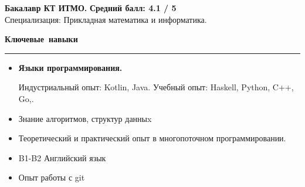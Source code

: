 \documentclass[12pt, a4paper]{report}
\begin{document}
    \textbf{Бакалавр КТ ИТМО.}
    \hfill
    \textbf{ Средний балл: 4.1 / 5} \\
    Специализация: Прикладная математика и информатика.\\


    \par\hbox{\large\textbf{Ключевые навыки}}\kern5pt\hrule\kern5pt

    \begin{itemize}

        \item \textbf{Языки программирования.}

        Индустриальный опыт: Kotlin, Java. Учебный опыт: Haskell, Python, C++, Go,.

        \item Знание алгоритмов, структур данныx
        \item Теоретический и практический опыт в многопоточном программировании.
        \item B1-B2 Английский язык
        \item Опыт работы с git
    \end{itemize}
\end{document}
